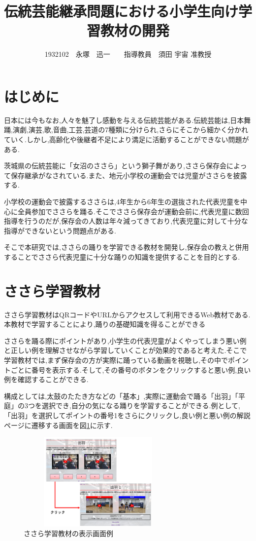 \documentclass[twocolumn,10pt,a4j]{ltjsarticle}
\title{伝統芸能継承問題における小学生向け学習教材の開発}
\author{1932102　永塚　迅一　　指導教員　須田 宇宙 准教授}
\date{}
\begin{document}
\maketitle
\section{はじめに}

日本には今もなお,人々を魅了し感動を与える伝統芸能がある.伝統芸能は,日本舞踊,演劇,演芸,歌,音曲,工芸,芸道の7種類に分けられ,さらにそこから細かく分かれていく.しかし,高齢化や後継者不足により満足に活動することができない問題がある.

茨城県の伝統芸能に「女沼のささら」という獅子舞があり,ささら保存会によって保存継承がなされている.また、地元小学校の運動会では児童がささらを披露する.

小学校の運動会で披露するささらは,4年生から6年生の選抜された代表児童を中心に全員参加でささらを踊る.そこでささら保存会が運動会前に,代表児童に数回指導を行うのだが,保存会の人数は年々減ってきており,代表児童に対して十分な指導ができないという問題点がある.

そこで本研究では,ささらの踊りを学習できる教材を開発し,保存会の教えと併用することでささら代表児童に十分な踊りの知識を提供することを目的とする.

\section{ささら学習教材}
ささら学習教材はQRコードやURLからアクセスして利用できるWeb教材である.本教材で学習することにより,踊りの基礎知識を得ることができる


ささらを踊る際にポイントがあり,小学生の代表児童がよくやってしまう悪い例と正しい例を理解させながら学習していくことが効果的であると考えた.そこで学習教材では,まず保存会の方が実際に踊っている動画を視聴し,その中でポイントごとに番号を表示する.そして,その番号のボタンをクリックすると悪い例,良い例を確認することができる.

構成としては,太鼓のたたき方などの「基本」,実際に運動会で踊る「出羽」「平庭」の3つを選択でき,自分の気になる踊りを学習することができる.例として,「出羽」を選択してポイントの番号1をさらにクリックし,良い例と悪い例の解説ページに遷移する画面を図\ref{fig:ささら}に示す.
\begin{figure}[h]
\begin{center}
 \includegraphics[clip,width=80mm,height=48mm]{figures/kyouzai12.png}
\end{center}
 \caption{ささら学習教材の表示画面例}
 \label{fig:ささら}
\end{figure}
\end{document}
